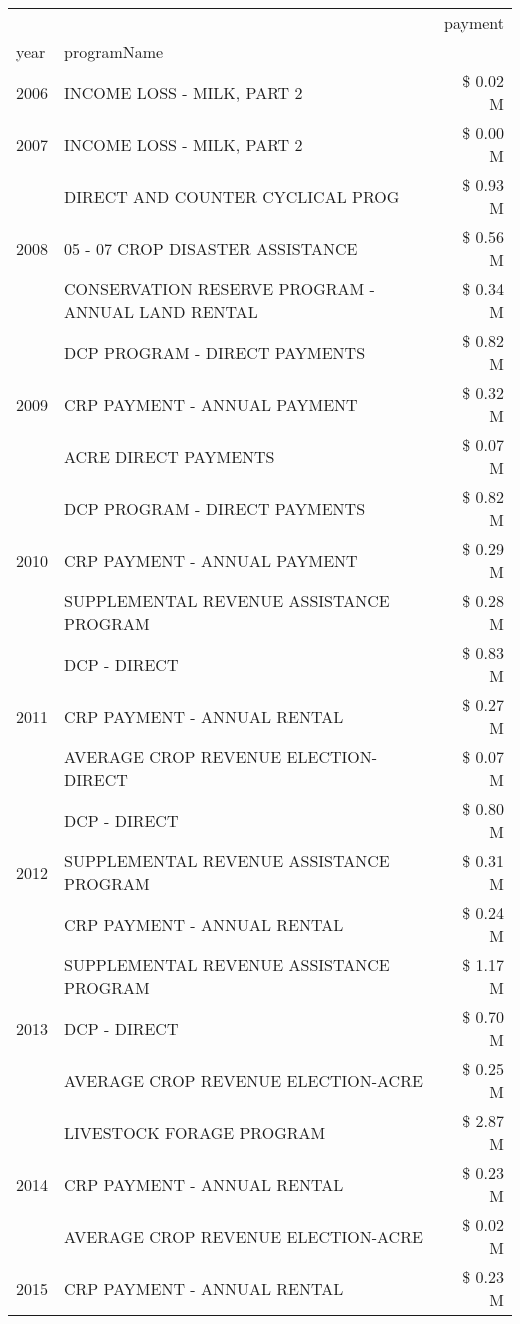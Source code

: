 \begin{tabular}{llr}
\toprule
 &  & payment \\
year & programName &  \\
\midrule
2006 & INCOME LOSS - MILK, PART 2 & \$ 0.02 M \\
\cline{1-3}
2007 & INCOME LOSS - MILK, PART 2 & \$ 0.00 M \\
\cline{1-3}
\multirow[t]{3}{*}{2008} & DIRECT AND COUNTER CYCLICAL PROG & \$ 0.93 M \\
 & 05 - 07 CROP DISASTER ASSISTANCE & \$ 0.56 M \\
 & CONSERVATION RESERVE PROGRAM - ANNUAL LAND RENTAL & \$ 0.34 M \\
\cline{1-3}
\multirow[t]{3}{*}{2009} & DCP PROGRAM - DIRECT PAYMENTS & \$ 0.82 M \\
 & CRP PAYMENT - ANNUAL PAYMENT & \$ 0.32 M \\
 & ACRE DIRECT PAYMENTS & \$ 0.07 M \\
\cline{1-3}
\multirow[t]{3}{*}{2010} & DCP PROGRAM - DIRECT PAYMENTS & \$ 0.82 M \\
 & CRP PAYMENT - ANNUAL PAYMENT & \$ 0.29 M \\
 & SUPPLEMENTAL REVENUE ASSISTANCE PROGRAM & \$ 0.28 M \\
\cline{1-3}
\multirow[t]{3}{*}{2011} & DCP - DIRECT & \$ 0.83 M \\
 & CRP PAYMENT - ANNUAL RENTAL & \$ 0.27 M \\
 & AVERAGE CROP REVENUE ELECTION-DIRECT & \$ 0.07 M \\
\cline{1-3}
\multirow[t]{3}{*}{2012} & DCP - DIRECT & \$ 0.80 M \\
 & SUPPLEMENTAL REVENUE ASSISTANCE PROGRAM & \$ 0.31 M \\
 & CRP PAYMENT - ANNUAL RENTAL & \$ 0.24 M \\
\cline{1-3}
\multirow[t]{3}{*}{2013} & SUPPLEMENTAL REVENUE ASSISTANCE PROGRAM & \$ 1.17 M \\
 & DCP - DIRECT & \$ 0.70 M \\
 & AVERAGE CROP REVENUE ELECTION-ACRE & \$ 0.25 M \\
\cline{1-3}
\multirow[t]{3}{*}{2014} & LIVESTOCK FORAGE PROGRAM & \$ 2.87 M \\
 & CRP PAYMENT - ANNUAL RENTAL & \$ 0.23 M \\
 & AVERAGE CROP REVENUE ELECTION-ACRE & \$ 0.02 M \\
\cline{1-3}
\multirow[t]{3}{*}{2015} & CRP PAYMENT - ANNUAL RENTAL & \$ 0.23 M \\

\end{tabular}
